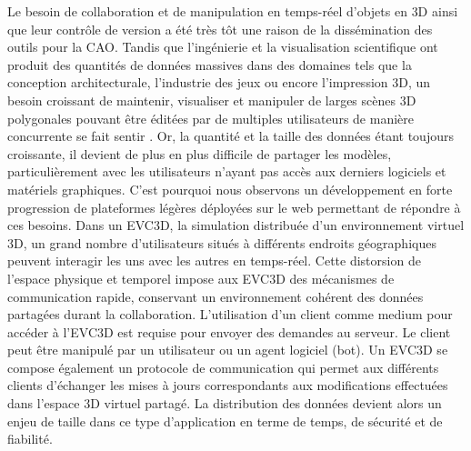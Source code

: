 
Le besoin de collaboration et de manipulation en temps-réel d'objets en \gls{3D} 
ainsi que leur contrôle de version a été très tôt une raison de la dissémination des 
outils pour la \gls{CAO}. Tandis que l'ingénierie et la visualisation scientifique ont 
produit des quantités de données massives dans des domaines tels que la 
conception architecturale, l'industrie des jeux ou encore l'impression \gls{3D}, un 
besoin croissant de maintenir, visualiser et manipuler de larges scènes \gls{3D} 
polygonales pouvant être éditées par de multiples utilisateurs de manière 
concurrente se fait sentir \cite{Chandrasegaran2013,Wu2014}. Or, la quantité et la taille des données 
étant toujours croissante, il devient de plus en plus difficile de partager les 
modèles, particulièrement avec les utilisateurs n'ayant pas accès aux derniers 
logiciels et matériels graphiques. C'est pourquoi nous observons un 
développement en forte progression de plateformes légères déployées sur le web 
permettant de répondre à ces besoins. 
Dans un \gls{EVC3D}, la simulation distribuée d'un environnement virtuel 3D, un 
grand nombre d'utilisateurs situés à différents endroits géographiques peuvent 
interagir les uns avec les autres en temps-réel. 
Cette distorsion de l'espace physique et temporel impose aux \gls{EVC3D} des 
mécanismes de communication rapide, conservant un environnement cohérent
des données partagées durant la collaboration. 
L'utilisation d'un client comme medium pour 
accéder à l'\gls{EVC3D} est requise pour envoyer des demandes au serveur. Le 
client peut être manipulé par un utilisateur ou un agent logiciel (bot).
Un \gls{EVC3D} se compose également un protocole de communication qui 
permet aux différents clients d'échanger les mises à jours correspondants aux 
modifications effectuées dans l'espace 3D virtuel partagé. La distribution des 
données devient alors un enjeu de taille dans ce type d'application en terme de 
temps, de sécurité et de fiabilité. 

